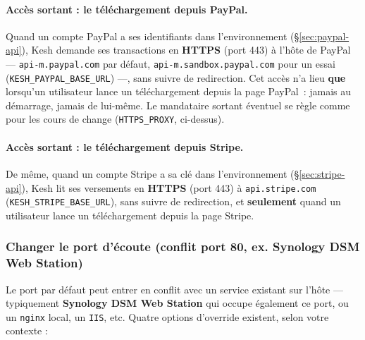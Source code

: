 \documentclass[a4paper,11pt,oneside]{article}
\begin{document}
\begin{sloppypar}
\paragraph{Accès sortant : le téléchargement depuis PayPal.}\label{sec:acces-sortant-paypal} Quand un compte PayPal a ses identifiants dans l'environnement (\S\ref{sec:paypal-api}), Kesh demande ses transactions en \textbf{HTTPS} (port 443) à l'hôte de PayPal --- \texttt{api-m.paypal.com} par défaut, \texttt{api-m.sandbox.paypal.com} pour un essai (\texttt{KESH\_PAYPAL\_BASE\_URL}) ---, sans suivre de redirection. Cet accès n'a lieu \textbf{que} lorsqu'un utilisateur lance un téléchargement depuis la page PayPal~: jamais au démarrage, jamais de lui-même. Le mandataire sortant éventuel se règle comme pour les cours de change (\texttt{HTTPS\_PROXY}, ci-dessus).

\paragraph{Accès sortant : le téléchargement depuis Stripe.}\label{sec:acces-sortant-stripe} De même, quand un compte Stripe a sa clé dans l'environnement (\S\ref{sec:stripe-api}), Kesh lit ses versements en \textbf{HTTPS} (port 443) à \texttt{api.stripe.com} (\texttt{KESH\_STRIPE\_BASE\_URL}), sans suivre de redirection, et \textbf{seulement} quand un utilisateur lance un téléchargement depuis la page Stripe.
\end{sloppypar}

\subsubsection{Changer le port d'écoute (conflit port 80, ex. Synology DSM Web Station)}

Le port  par défaut peut entrer en conflit avec un service existant sur l'hôte — typiquement \textbf{Synology DSM Web Station} qui occupe également ce port, ou un \texttt{nginx} local, un \texttt{IIS}, etc. Quatre options d'override existent, selon votre contexte :
\end{document}

